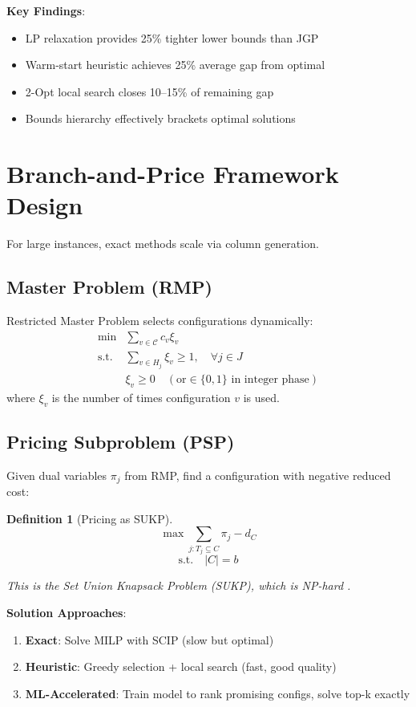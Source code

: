 \documentclass[12pt]{article}
\newtheorem{definition}{Definition}[section]
\begin{document}
	\textbf{Key Findings}:
	\begin{itemize}
		\item LP relaxation provides 25\% tighter lower bounds than JGP
		\item Warm-start heuristic achieves 25\% average gap from optimal
		\item 2-Opt local search closes 10--15\% of remaining gap
		\item Bounds hierarchy effectively brackets optimal solutions
	\end{itemize}
	
	\section{Branch-and-Price Framework Design}
	
	For large instances, exact methods scale via column generation.
	
	\subsection{Master Problem (RMP)}
	
	Restricted Master Problem selects configurations dynamically:
	\begin{align}
		\min & \sum_{v \in \mathcal{C}} c_v \xi_v \\
		\text{s.t.} & \sum_{v \in H_j} \xi_v \ge 1, \quad \forall j \in J \\
		& \xi_v \ge 0 \quad (\text{or} \in \{0,1\} \text{ in integer phase})
	\end{align}
	where $\xi_v$ is the number of times configuration $v$ is used.
	
	\subsection{Pricing Subproblem (PSP)}
	
	Given dual variables $\pi_j$ from RMP, find a configuration with negative reduced cost:
	
	\begin{definition}[Pricing as SUKP]
		\label{def:sukp_pricing}
		$$\max \sum_{j: T_j \subseteq C} \pi_j - d_C$$
		$$\text{s.t.} \quad |C| = b$$
		
		This is the Set Union Knapsack Problem (SUKP), which is NP-hard \citep{Goldschmidt1994}.
	\end{definition}
	
	\textbf{Solution Approaches}:
	\begin{enumerate}
		\item \textbf{Exact}: Solve MILP with SCIP (slow but optimal)
		\item \textbf{Heuristic}: Greedy selection + local search (fast, good quality)
		\item \textbf{ML-Accelerated}: Train model to rank promising configs, solve top-k exactly
	\end{enumerate}
	
\end{document}
